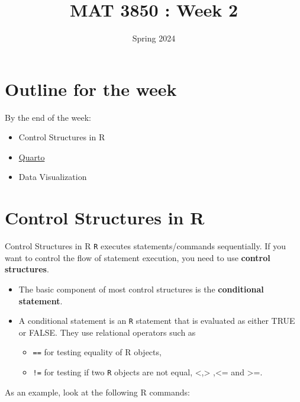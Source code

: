 \documentclass[
  ignorenonframetext,
]{beamer}
\title{MAT 3850 : Week 2}
\author{Spring 2024}
\date{}
\institute{Appalachian State University}
\providecommand{\tightlist}{%
  \setlength{\itemsep}{0pt}\setlength{\parskip}{0pt}}
\begin{document}
\frame{\titlepage}

\hypertarget{outline-for-the-week}{%
\section{Outline for the week}\label{outline-for-the-week}}

\begin{frame}{By the end of the week:}
\protect\hypertarget{by-the-end-of-the-week}{}
\begin{itemize}
\tightlist
\item
  Control Structures in R
\item
  \href{https://quarto.org/}{Quarto}
\item
  Data Visualization
\end{itemize}
\end{frame}

\hypertarget{control-structures-in-r}{%
\section{Control Structures in R}\label{control-structures-in-r}}

\begin{frame}[fragile]{Control Structures in R}
\protect\hypertarget{control-structures-in-r-1}{}
\texttt{R} executes statements/commands sequentially. If you want to
control the flow of statement execution, you need to use \textbf{control
structures}.

\begin{itemize}
\item
  The basic component of most control structures is the
  \textbf{conditional statement}.
\item
  A conditional statement is an \texttt{R} statement that is evaluated
  as either TRUE or FALSE. They use relational operators such as

  \begin{itemize}
  \item
    \texttt{==} for testing equality of R objects,
  \item
    \texttt{!=} for testing if two \texttt{R} objects are not equal,
    \textless,\textgreater{} ,\textless= and \textgreater=.
  \end{itemize}
\end{itemize}

As an example, look at the following R commands:
\end{frame}
\end{document}
